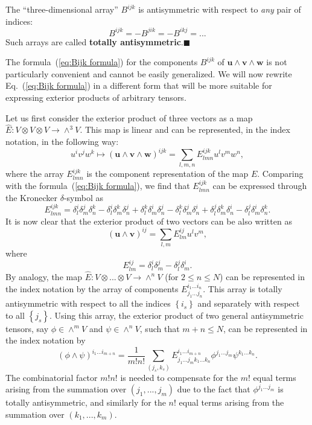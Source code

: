 The {}``three-dimen\-sion\-al array'' $B^{ijk}$ is antisymmetric
with respect to \emph{any} pair of indices: \[
B^{ijk}=-B^{jik}=-B^{ikj}=...\]
Such arrays are called \textbf{totally antisymmetric}.\hfill{}$\blacksquare$

The formula~(\ref{eq:Bijk formula}) for the components $B^{ijk}$
of $\mathbf{u}\wedge\mathbf{v}\wedge\mathbf{w}$ is not particularly
convenient and cannot be easily generalized. We will now rewrite Eq.~(\ref{eq:Bijk formula})
in a different form that will be more suitable for expressing exterior
products of arbitrary tensors.

Let us first consider the exterior product of three vectors as a map
$\hat{E}:V\otimes V\otimes V\rightarrow\wedge^{3}V$. This map is
linear and can be represented, in the index notation, in the following
way:\[
u^{i}v^{j}w^{k}\mapsto\left(\mathbf{u}\wedge\mathbf{v}\wedge\mathbf{w}\right)^{ijk}=\sum_{l,m,n}E_{lmn}^{ijk}u^{l}v^{m}w^{n},\]
where the array $E_{lmn}^{ijk}$ is the component representation of
the map $E$. Comparing with the formula~(\ref{eq:Bijk formula}),
we find that $E_{lmn}^{ijk}$ can be expressed through the Kronecker
$\delta$-symbol as\[
E_{lmn}^{ijk}=\delta_{l}^{i}\delta_{m}^{j}\delta_{n}^{k}-\delta_{l}^{i}\delta_{m}^{k}\delta_{n}^{j}+\delta_{l}^{k}\delta_{m}^{i}\delta_{n}^{j}-\delta_{l}^{k}\delta_{m}^{j}\delta_{n}^{i}+\delta_{l}^{j}\delta_{m}^{k}\delta_{n}^{i}-\delta_{l}^{j}\delta_{m}^{i}\delta_{n}^{k}.\]
 It is now clear that the exterior product of two vectors can be also
written as\[
(\mathbf{u}\wedge\mathbf{v})^{ij}=\sum_{l,m}E_{lm}^{ij}u^{l}v^{m},\]
where\[
E_{lm}^{ij}=\delta_{l}^{i}\delta_{m}^{j}-\delta_{l}^{j}\delta_{m}^{i}.\]
By analogy, the map $\hat{E}:V\otimes...\otimes V\rightarrow\wedge^{n}V$
(for $2\leq n\leq N$) can be represented in the index notation by
the array of components $E_{j_{1}...j_{n}}^{i_{1}...i_{n}}$. This
array is totally antisymmetric with respect to all the indices $\left\{ i_{s}\right\} $
and separately with respect to all $\left\{ j_{s}\right\} $. Using
this array, the exterior product of two general antisymmetric tensors,
say $\phi\in\wedge^{m}V$ and $\psi\in\wedge^{n}V$, such that $m+n\leq N$,
can be represented in the index notation by\[
(\phi\wedge\psi)^{i_{1}...i_{m+n}}=\frac{1}{m!n!}\sum_{(j_{s},k_{s})}E_{j_{1}...j_{m}k_{1}...k_{n}}^{i_{1}...i_{m+n}}\phi^{j_{1}...j_{m}}\psi^{k_{1}...k_{n}}.\]
The combinatorial factor $m!n!$ is needed to compensate for the $m!$
equal terms arising from the summation over $\left(j_{1},...,j_{m}\right)$
due to the fact that $\phi^{j_{1}...j_{m}}$ is totally antisymmetric,
and similarly for the $n!$ equal terms arising from the summation
over $\left(k_{1},...,k_{m}\right)$.

